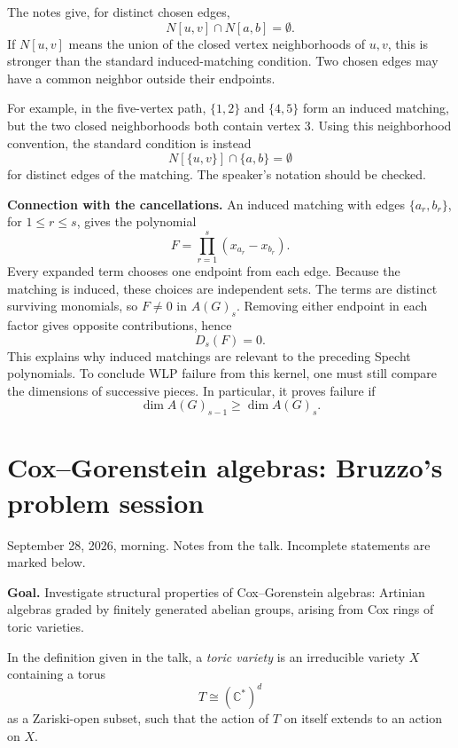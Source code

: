 \begin{remark}
\label{remark-induced-neighborhoods}
The notes give, for
distinct chosen edges,
$$
N[u,v]\cap N[a,b]=\emptyset.
$$
If $N[u,v]$ means the union of the
closed vertex neighborhoods of $u,v$,
this is stronger than the standard
induced-matching condition.
Two chosen edges may have a common
neighbor outside their endpoints.

For example, in the five-vertex path,
$\{1,2\}$ and $\{4,5\}$ form an induced
matching, but the two closed
neighborhoods both contain vertex $3$.
Using this neighborhood convention,
the standard condition is instead
$$
N[\{u,v\}]\cap\{a,b\}=\emptyset
$$
for distinct edges of the matching.
The speaker's notation should be checked.
\end{remark}

\medskip\noindent
\textbf{Connection with the cancellations.}
An induced matching with edges
$\{a_r,b_r\}$, for $1\leq r\leq s$,
gives the polynomial
$$
F=\prod_{r=1}^{s}(x_{a_r}-x_{b_r}).
$$
Every expanded term chooses one endpoint
from each edge.
Because the matching is induced, these
choices are independent sets.
The terms are distinct surviving
monomials, so $F\ne0$ in $A(G)_s$.
Removing either endpoint in each factor
gives opposite contributions, hence
$$
D_s(F)=0.
$$
This explains why induced matchings
are relevant to the preceding Specht
polynomials.
To conclude WLP failure from this
kernel, one must still compare
the dimensions of successive pieces.
In particular, it proves failure if
$$
\dim A(G)_{s-1}\geq\dim A(G)_s.
$$

\section{Cox--Gorenstein algebras:
Bruzzo's problem session}
\label{section-cox-gorenstein-session}

September 28, 2026, morning.
Notes from the talk.
Incomplete statements are marked below.

\medskip\noindent
\textbf{Goal.}
Investigate structural properties of
Cox--Gorenstein algebras: Artinian
algebras graded by finitely generated
abelian groups, arising from Cox rings
of toric varieties.

\begin{definition}
\label{definition-session-toric-variety}
In the definition given in the talk,
a \emph{toric variety} is an irreducible
variety $X$ containing a torus
$$
T\cong(\mathbb{C}^{*})^d
$$
as a Zariski-open subset, such that
the action of $T$ on itself extends
to an action on $X$.
\end{definition}

